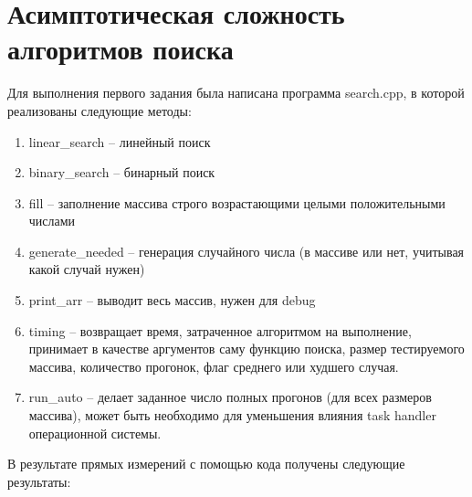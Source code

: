 \documentclass[a4paper,12pt]{report}
\begin{document}
	
	\newpage
    
    \section*{Асимптотическая сложность алгоритмов поиска}
    Для выполнения первого задания была написана программа search.cpp, в которой реализованы следующие методы:
    \begin{enumerate}
        \item linear\_search -- линейный поиск
        \item binary\_search -- бинарный поиск
        \item fill -- заполнение массива строго возрастающими целыми положительными числами
        \item generate\_needed -- генерация случайного числа (в массиве или нет, учитывая какой случай нужен)
        \item print\_arr -- выводит весь массив, нужен для debug
        \item timing -- возвращает время, затраченное алгоритмом на выполнение, принимает в качестве аргументов саму функцию поиска, размер тестируемого массива, количество прогонок, флаг среднего или худшего случая.
        \item run\_auto -- делает заданное число полных прогонов (для всех размеров массива), может быть необходимо для уменьшения влияния task handler операционной системы. 
    \end{enumerate}
    В результате прямых измерений с помощью кода получены следующие результаты:
\end{document}
